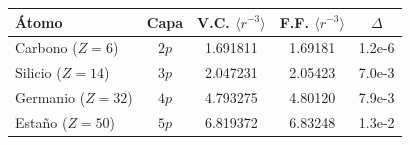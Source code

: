 \begin{tabular}{l c S[table-format=1.6] S[table-format=1.6] S[table-format=1.1e-1]}
    \toprule
    \textbf{Átomo} & \textbf{Capa} & {\textbf{V.C. $\langle r^{-3} \rangle$}} & {\textbf{F.F. $\langle r^{-3} \rangle$}} & {$\Delta$} \\
    \midrule
    Carbono ($Z=6$) & $2p$ & 1.691811 & 1.69181 & 1.2e-6 \\
    Silicio ($Z=14$) & $3p$ & 2.047231 & 2.05423 & 7.0e-3 \\
    Germanio ($Z=32$) & $4p$ & 4.793275 & 4.80120 & 7.9e-3 \\
    Estaño ($Z=50$) & $5p$ & 6.819372 & 6.83248 & 1.3e-2 \\
    \bottomrule
\end{tabular}

